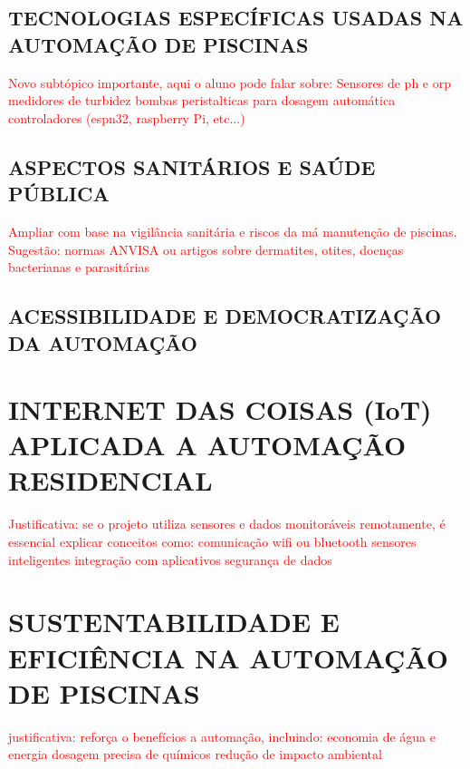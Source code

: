     \subsection{TECNOLOGIAS ESPECÍFICAS USADAS NA AUTOMAÇÃO DE PISCINAS}
        \textcolor{red}{Novo subtópico importante, aqui o aluno pode falar sobre: 
        Sensores de ph e orp
        medidores de turbidez
        bombas peristalticas para dosagem automática
        controladores (espn32, raspberry Pi, etc...)}

    \subsection{ASPECTOS SANITÁRIOS E SAÚDE PÚBLICA}
        \textcolor{red}{Ampliar com base na vigilância sanitária e riscos da má manutenção de piscinas. Sugestão: normas ANVISA ou artigos sobre dermatites, otites, doenças bacterianas e parasitárias}

    \subsection{ACESSIBILIDADE E DEMOCRATIZAÇÃO DA AUTOMAÇÃO}


\section{INTERNET DAS COISAS (IoT) APLICADA A AUTOMAÇÃO RESIDENCIAL}
    \textcolor{red}{Justificativa: se o projeto utiliza sensores e dados monitoráveis remotamente, é essencial explicar conceitos como:
        comunicação wifi ou bluetooth
        sensores inteligentes
        integração com aplicativos
        segurança de dados}

\section{SUSTENTABILIDADE E EFICIÊNCIA NA AUTOMAÇÃO DE PISCINAS}
    \textcolor{red}{justificativa: reforça o benefícios a automação, incluindo:
        economia de água e energia
        dosagem precisa de químicos
        redução de impacto ambiental}

